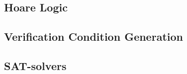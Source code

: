 \subsection{Hoare Logic}


\subsection{Verification Condition Generation}


\subsection{SAT-solvers}

